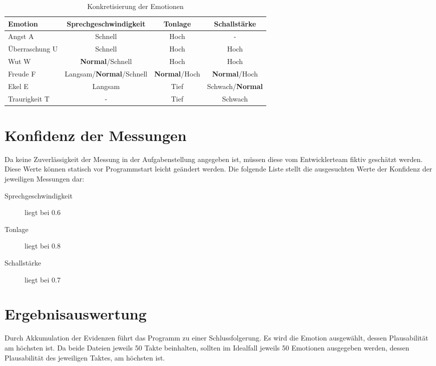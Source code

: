 \begin{table}[h]
\begin{tabular}{ l | c | c | c}
  Emotion & Sprechgeschwindigkeit & Tonlage & Schallstärke \\
  \hline 
  Angst A & Schnell & Hoch & - \\
  Überraschung U & Schnell & Hoch & Hoch \\
  Wut W & \textbf{Normal}/Schnell & Hoch & Hoch \\
  Freude F & Langsam/\textbf{Normal}/Schnell & \textbf{Normal}/Hoch &\textbf{Normal}/Hoch\\
  Ekel E & Langsam & Tief & Schwach/\textbf{Normal} \\
  Traurigkeit T & - & Tief & Schwach \\
\end{tabular}
\caption{Konkretisierung der Emotionen}
\label{tab:konkretisierteEmotionen}
\end{table}

\section{Konfidenz der Messungen}
\label{konfidenzfestlegung}
Da keine Zuverlässigkeit der Messung in der Aufgabenstellung angegeben ist, müssen diese vom Entwicklerteam fiktiv geschätzt werden. Diese Werte können statisch vor Programmstart leicht geändert werden. Die folgende Liste stellt die ausgesuchten Werte der Konfidenz der jeweiligen Messungen dar:
\begin{description}
\item [Sprechgeschwindigkeit] liegt bei 0.6
\item [Tonlage] liegt bei 0.8
\item [Schallstärke] liegt bei 0.7
\end{description}


\section{Ergebnisauswertung}
Durch Akkumulation der Evidenzen führt das Programm zu einer Schlussfolgerung. Es wird die Emotion ausgewählt, dessen Plausabilität am höchsten ist. Da beide Dateien jeweils 50 Takte beinhalten, sollten im Idealfall jeweils 50 Emotionen ausgegeben werden, dessen Plausabilität des jeweiligen Taktes, am höchsten ist.



